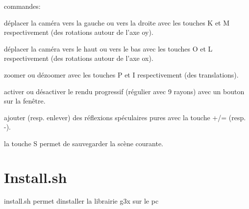 commandes\+:
\begin{DoxyItemize}
\item déplacer la caméra vers la gauche ou vers la droite avec les touches K et M respectivement (des rotations autour de l’axe oy). ~\newline

\item déplacer la caméra vers le haut ou vers le bas avec les touches O et L respectivement (des rotations autour de l’axe ox). ~\newline

\item zoomer ou dézoomer avec les touches P et I respectivement (des translations). ~\newline

\item activer ou désactiver le rendu progressif (régulier avec 9 rayons) avec un bouton sur la fenêtre. ~\newline

\item ajouter (resp. enlever) des réflexions spéculaires pures avec la touche +/= (resp. -\/). ~\newline

\item la touche S permet de sauvegarder la scène courante. ~\newline

\end{DoxyItemize}

\section*{Install.\+sh}

install.\+sh permet d\textquotesingle{}installer la librairie g3x sur le pc 